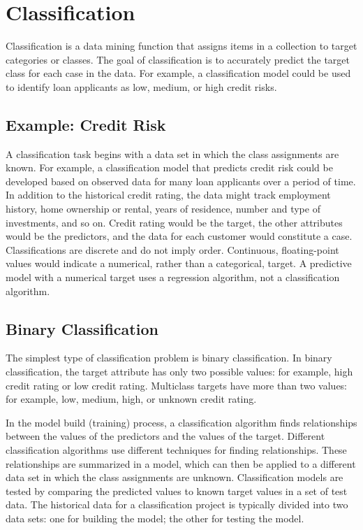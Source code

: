 \documentclass[]{report}
\begin{document}
\section{Classification}
Classification is a data mining function that assigns items in a collection to target categories or classes. The goal of classification is to accurately predict the target class for each case in the data. For example, a classification model could be used to identify loan applicants as low, medium, or high credit risks.

\subsection{Example: Credit Risk}
A classification task begins with a data set in which the class assignments are known. For example, a classification model that predicts credit risk could be developed based on observed data for many loan applicants over a period of time. In addition to the historical credit rating, the data might track employment history, home ownership or rental, years of residence, number and type of investments, and so on. Credit rating would be the target, the other attributes would be the predictors, and the data for each customer would constitute a case.
Classifications are discrete and do not imply order. Continuous, floating-point values would indicate a numerical, rather than a categorical, target. A predictive model with a numerical target uses a regression algorithm, not a classification algorithm.

\subsection{Binary Classification}
The simplest type of classification problem is binary classification. In binary classification, the target attribute has only two possible values: for example, high credit rating or low credit rating. Multiclass targets have more than two values: for example, low, medium, high, or unknown credit rating.

In the model build (training) process, a classification algorithm finds relationships between the values of the predictors and the values of the target. Different classification algorithms use different techniques for finding relationships. These relationships are summarized in a model, which can then be applied to a different data set in which the class assignments are unknown.
Classification models are tested by comparing the predicted values to known target values in a set of test data. The historical data for a classification project is typically divided into two data sets: one for building the model; the other for testing the model.
\end{document}
